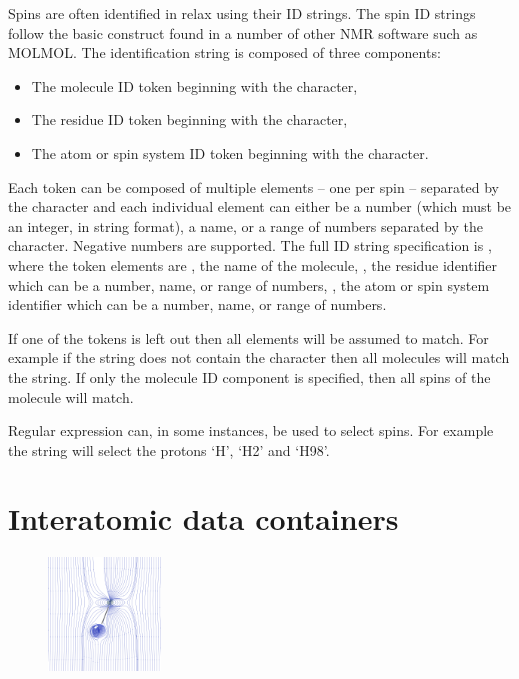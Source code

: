 Spins are often identified in relax using their ID strings.
The spin ID strings follow the basic construct found in a number of other NMR software such as MOLMOL.
The identification string is composed of three components:
\begin{itemize}
  \item The molecule ID token beginning with the \promptstring{\#} character,
  \item The residue ID token beginning with the \promptstring{:} character,
  \item The atom or spin system ID token beginning with the  character.
\end{itemize}

Each token can be composed of multiple elements -- one per spin -- separated by the \promptstring{,} character and each individual element can either be a number (which must be an integer, in string format), a name, or a range of numbers separated by the \promptstring{-} character.
Negative numbers are supported.
The full ID string specification is , where the token elements are , the name of the molecule, , the residue identifier which can be a number, name, or range of numbers, , the atom or spin system identifier which can be a number, name, or range of numbers.

If one of the tokens is left out then all elements will be assumed to match.
For example if the string does not contain the \promptstring{\#} character then all molecules will match the string.
If only the molecule ID component is specified, then all spins of the molecule will match.

Regular expression can, in some instances, be used to select spins.
For example the string  will select the protons `H', `H2' and `H98'.




\section{Interatomic data containers} \label{sect: interatomic container}

\begin{figure}[h]
  \includegraphics[width=3cm, bb=0 0 1701 1701]{graphics/wizards/dipole_pair/NH_dipole_pair_600x600}
\end{figure}

